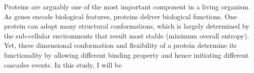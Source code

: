 Proteins are arguably one of the most important component in a living organism. As genes encode biological features, proteins deliver biological functions. One protein can adopt many structural conformations, which is largely determined by the sub-cellular environments that result most stable (minimum overall entropy). Yet, three dimensional conformation and flexibility of a protein determine its functionality by allowing different binding property and hence initiating different cascades events. In this study, I will be 